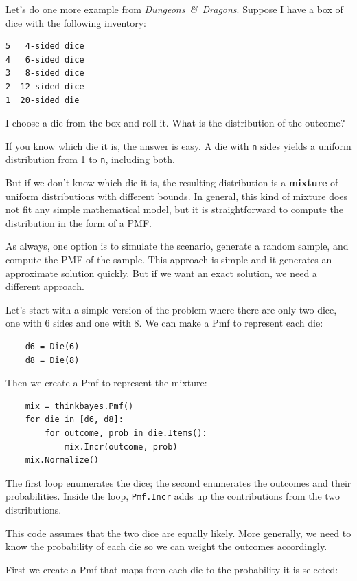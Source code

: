 \documentclass[12pt]{book}
\begin{document}
Let's do one more example from {\it Dungeons~\&~Dragons}.  Suppose
I have a box of dice with the following inventory:

\begin{verbatim}
5   4-sided dice
4   6-sided dice
3   8-sided dice
2  12-sided dice
1  20-sided die
\end{verbatim}

I choose a die from the box and roll it.  What is the distribution
of the outcome?

If you know which die it is, the answer is easy.  A die with {\tt n}
sides yields a uniform distribution from 1 to {\tt n}, including both.

But if we don't know which die it is, the resulting distribution is
a {\bf mixture} of uniform distributions with different bounds.
In general, this kind of mixture does not fit any simple mathematical
model, but it is straightforward to compute the distribution in
the form of a PMF.

As always, one option is to simulate the scenario, generate a random
sample, and compute the PMF of the sample.  This approach is simple
and it generates an approximate solution quickly.  But if we want an
exact solution, we need a different approach.

Let's start with a simple version of the problem where there are
only two dice, one with 6 sides and one with 8.  We can make a Pmf to
represent each die:

\begin{verbatim}
    d6 = Die(6)
    d8 = Die(8)
\end{verbatim}

Then we create a Pmf to represent the mixture:

\begin{verbatim}
    mix = thinkbayes.Pmf()
    for die in [d6, d8]:
        for outcome, prob in die.Items():
            mix.Incr(outcome, prob)
    mix.Normalize()
\end{verbatim}

The first loop enumerates the dice; the second enumerates the
outcomes and their probabilities.  Inside the loop,
{\tt Pmf.Incr} adds up the contributions from the two distributions.

This code assumes that the two dice are equally likely.  More
generally, we need to know the probability of each die so we can
weight the outcomes accordingly.

First we create a Pmf that maps from each die to the probability it is
selected:
\end{document}
